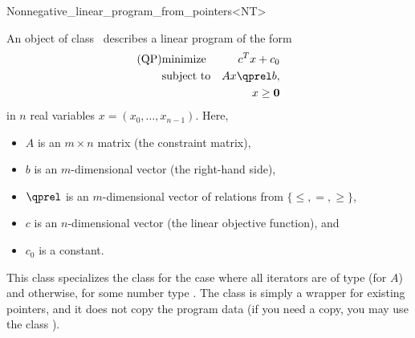 \begin{ccRefClass}{Nonnegative_linear_program_from_pointers<NT>}


\ccDefinition
An object of class \ccRefName\ describes a linear program of the form
\begin{eqnarray*}
\mbox{(QP)}& \mbox{minimize} & c^{T}x+c_0 \\
&\mbox{subject to}   & Ax\qprel b, \\
&                    & x \geq \mathbf{0}
\end{eqnarray*}
in $n$ real variables $x=(x_0,\ldots,x_{n-1})$.
Here, 
\begin{itemize}
\item $A$ is an $m\times n$ matrix (the constraint matrix), 
\item $b$ is an $m$-dimensional vector (the right-hand side),
\item $\qprel$ is an $m$-dimensional vector of relations 
from $\{\leq, =, \geq\}$, 
\item $c$ is an $n$-dimensional vector (the linear objective
  function), and 
\item $c_0$ is a constant.
\end{itemize}

This class specializes the class
for the case where all iterators are of type  (for
$A$) and  otherwise, for some number type .
The class is simply a wrapper for 
existing pointers, and it does not copy the program data (if you need
a copy, you may use the class ).

\ccIsModel
{}

\ccSeeAlso
{}\\

\end{ccRefClass}
